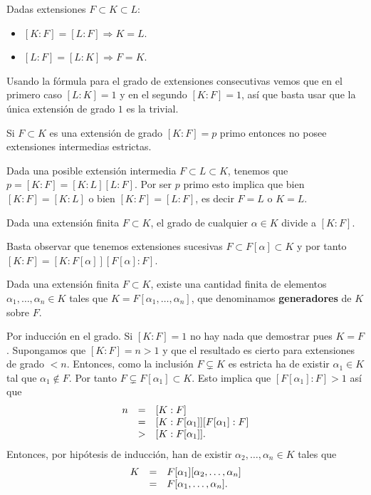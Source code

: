 
Dadas extensiones \(F\subset K\subset L\):

\begin{itemize}
\tightlist
\item
  \([K:F]=[L:F]\Rightarrow K=L\).
\item
  \([L:F]=[L:K]\Rightarrow F=K\).
\end{itemize}



Usando la fórmula para el grado de extensiones consecutivas vemos que en
el primero caso \([L:K]=1\) y en el segundo \([K:F]=1\), así que basta
usar que la única extensión de grado \(1\) es la trivial. 


Si \(F\subset K\) es una extensión de grado \([K:F]=p\) primo entonces
no posee extensiones intermedias estrictas. 


Dada una posible extensión intermedia \(F\subset L\subset K\), tenemos
que \(p=[K:F]=[K:L][L:F]\). Por ser \(p\) primo esto implica que bien
\([K:F]=[K:L]\) o bien \([K:F]=[L:F]\), es decir \(F=L\) o \(K=L\).\\


Dada una extensión finita \(F\subset K\), el grado de cualquier
\(\alpha\in K\) divide a \([K:F]\). 


Basta observar que tenemos extensiones sucesivas
\(F\subset F[\alpha]\subset K\) y por tanto
\([K:F]=[K:F[\alpha]][F[\alpha]:F]\). 


Dada una extensión finita \(F\subset K\), existe una cantidad finita de
elementos \(\alpha_1,\dots,\alpha_n\in K\) tales que
\(K=F[\alpha_1,\dots,\alpha_n]\), que denominamos \textbf{generadores}
de \(K\) sobre \(F\). 


Por inducción en el grado. Si \([K:F]=1\) no hay nada que demostrar pues
\(K=F\). Supongamos que \([K:F]=n>1\) y que el resultado es cierto para
extensiones de grado \({<}n\). Entonces, como la inclusión
\(F\subsetneq K\) es estricta ha de existir \(\alpha_1\in K\) tal que
\(\alpha_1\notin F\). Por tanto \(F\subsetneq F[\alpha_1]\subset K\).
Esto implica que \([F[\alpha_1]:F]>1\) así que
\[\begin{array}{rcl}n&=&[K:F]\cr &=&[K:F[\alpha_1]][F[\alpha_1]:F]\cr &>&[K:F[\alpha_1]].\end{array}\]
Entonces, por hipótesis de inducción, han de existir
\(\alpha_2,\dots,\alpha_n\in K\) tales que
\[\begin{array}{rcl}K&=&F[\alpha_1][\alpha_2,\dots,\alpha_n]\cr &=&F[\alpha_1,\dots,\alpha_n].\end{array}\]\\

